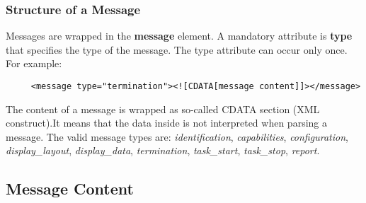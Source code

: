 \documentclass{article}
\begin{document}


   \subsubsection{Structure of a Message} \label{ss:structure}

    \noindent Messages are wrapped in the \textbf{message} element. A mandatory
    attribute is \textbf{type} that specifies the type of the message. The type
    attribute can occur only once. For example:
 
    \begin{verbatim}
     <message type="termination"><![CDATA[message content]]></message>\end{verbatim}

    The content of a message is wrapped as so-called CDATA section (XML
    construct).It means that the data inside is not interpreted when parsing a
    message. The valid message types are: \textit{identification},
    \textit{capabilities}, \textit{configuration}, \textit{display\_layout},
    \textit{display\_data}, \textit{termination}, \textit{task\_start},
    \textit{task\_stop}, \textit{report}.

  \subsection{Message Content}
\end{document}
